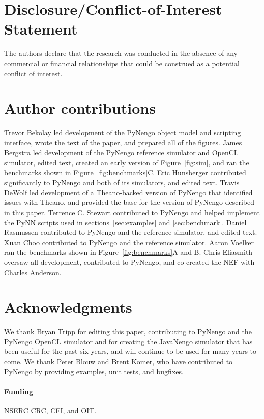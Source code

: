 \documentclass{frontiersSCNS}
\begin{document}
\section*{Disclosure/Conflict-of-Interest Statement}

The authors declare that the research was conducted in the absence of
any commercial or financial relationships that could be construed as a
potential conflict of interest.

\section*{Author contributions}

Trevor Bekolay led development of the
PyNengo object model and scripting interface,
wrote the text of the paper,
and prepared all of the figures.
James Bergstra led development of
the PyNengo reference simulator and OpenCL simulator,
edited text, created an early version
of Figure~\ref{fig:sim},
and ran the benchmarks shown in
Figure~\ref{fig:benchmarks}C.
Eric Hunsberger contributed significantly
to PyNengo and both of its simulators, and edited text.
Travis DeWolf led development
of a Theano-backed
version of PyNengo that
identified issues with Theano,
and provided the base for
the version of PyNengo described in this paper.
Terrence C. Stewart contributed
to PyNengo and helped implement
the PyNN scripts used in
sections~\ref{sec:examples} and \ref{sec:benchmark}.
Daniel Rasmussen contributed
to PyNengo and the reference simulator,
and edited text.
Xuan Choo contributed to PyNengo
and the reference simulator.
Aaron Voelker ran the benchmarks
shown in Figure~\ref{fig:benchmarks}A and B.
Chris Eliasmith oversaw all development,
contributed to PyNengo,
and co-created the NEF with Charles Anderson.

\section*{Acknowledgments}

We thank Bryan Tripp
for editing this paper,
contributing to PyNengo
and the PyNengo OpenCL simulator
and for creating the JavaNengo simulator
that has been useful
for the past six years,
and will continue
to be used for many years to come.
We thank Peter Blouw and Brent Komer,
who have contributed
to PyNengo by providing examples,
unit tests, and bugfixes.

\paragraph{Funding\textcolon}
NSERC CRC, CFI, and OIT.



\end{document}
